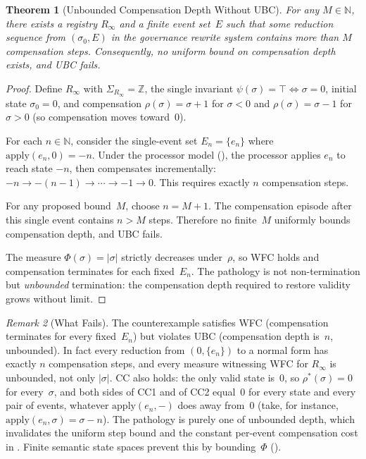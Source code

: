 \documentclass[11pt,a4paper]{article}
\theoremstyle{plain}
\newtheorem{theorem}{Theorem}[section]
\theoremstyle{definition}
\theoremstyle{remark}
\newtheorem{remark}[theorem]{Remark}
\renewcommand{\_}{\textunderscore\allowbreak}
\begin{document}
\begin{theorem}[Unbounded Compensation Depth Without UBC]
\label{thm:necessity}
For any $M \in \mathbb{N}$, there exists a registry $R_\infty$ and a finite
event set~$E$ such that some reduction sequence from $(\sigma_0, E)$ in the
governance rewrite system contains more than $M$ compensation steps.
Consequently, no uniform bound on compensation depth exists, and UBC fails.
\end{theorem}

\begin{proof}
Define $R_\infty$ with $\Sigma_{R_\infty} = \mathbb{Z}$, the single invariant
$\psi(\sigma) = \top \iff \sigma = 0$, initial state $\sigma_0 = 0$, and
compensation $\rho(\sigma) = \sigma + 1$ for $\sigma < 0$ and
$\rho(\sigma) = \sigma - 1$ for $\sigma > 0$ (so compensation moves
toward~$0$).

For each $n \in \mathbb{N}$, consider the single-event set $E_n = \{e_n\}$
where $\mathrm{apply}(e_n, 0) = -n$.  Under the processor model
(), the processor applies $e_n$ to reach state $-n$, then
compensates incrementally: $-n \to -(n-1) \to \cdots \to -1 \to 0$.  This
requires exactly $n$ compensation steps.

For any proposed bound~$M$, choose $n = M + 1$.  The compensation episode
after this single event contains $n > M$ steps.  Therefore no finite~$M$
uniformly bounds compensation depth, and UBC fails.

The measure $\Phi(\sigma) = |\sigma|$ strictly decreases under~$\rho$, so WFC
holds and compensation terminates for each fixed~$E_n$.  The pathology is not
non-termination but \emph{unbounded} termination: the compensation depth
required to restore validity grows without limit.
\end{proof}

\begin{remark}[What Fails]
The counterexample satisfies WFC (compensation terminates for every
fixed~$E_n$) but violates UBC (compensation depth is~$n$, unbounded).  In
fact every reduction from $(0, \{e_n\})$ to a normal form has exactly $n$
compensation steps, and every measure witnessing WFC for $R_\infty$ is
unbounded, not only $|\sigma|$.  CC also holds: the only valid state is~$0$,
so $\rho^*(\sigma) = 0$ for every~$\sigma$, and both sides of CC1 and of CC2
equal~$0$ for every state and every pair of events, whatever
$\mathrm{apply}(e_n, -)$ does away from~$0$ (take, for instance,
$\mathrm{apply}(e_n, \sigma) = \sigma - n$).  The pathology is purely one of
unbounded depth, which invalidates the uniform step bound and the constant
per-event compensation cost in .  Finite semantic state
spaces prevent this by bounding~$\Phi$ ().
\end{remark}
\end{document}
